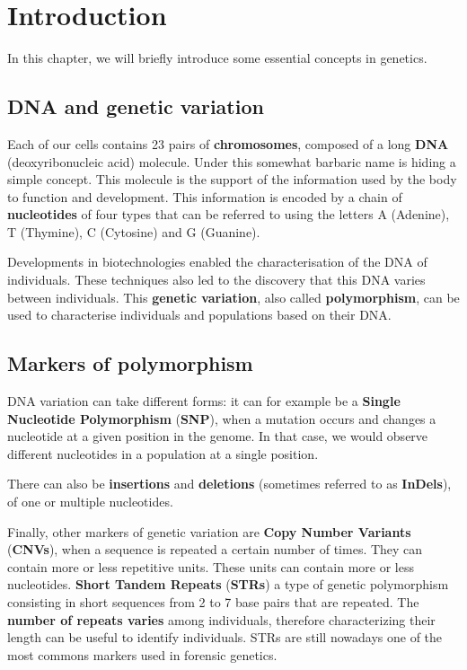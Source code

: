 \documentclass[
]{book}
\begin{document}
\hypertarget{introduction}{%
\chapter*{Introduction}\label{introduction}}

In this chapter, we will briefly introduce some essential concepts in genetics.

\hypertarget{dna-and-genetic-variation}{%
\section*{DNA and genetic variation}\label{dna-and-genetic-variation}}

Each of our cells contains 23 pairs of \textbf{chromosomes}, composed of a long \textbf{DNA}
(deoxyribonucleic acid) molecule. Under this somewhat barbaric name
is hiding a simple concept. This molecule is the support of the information
used by the body to function and development. This information is encoded by a
chain of \textbf{nucleotides} of four types that can be referred to using the letters
A (Adenine), T (Thymine), C (Cytosine) and G (Guanine).

Developments in biotechnologies enabled the characterisation of the DNA of
individuals. These techniques also led to the discovery that this DNA varies
between individuals. This \textbf{genetic variation}, also called \textbf{polymorphism},
can be used to characterise individuals and populations based on their DNA.

\hypertarget{markers-of-polymorphism}{%
\section*{Markers of polymorphism}\label{markers-of-polymorphism}}

DNA variation can take different forms: it can for example be a
\textbf{Single Nucleotide Polymorphism} (\textbf{SNP}), when a mutation occurs and changes a
nucleotide at a given position in the genome. In that case, we would observe
different nucleotides in a population at a single position.

There can also be \textbf{insertions} and \textbf{deletions} (sometimes referred to as
\textbf{InDels}), of one or multiple nucleotides.

Finally, other markers of genetic variation are \textbf{Copy Number Variants} (\textbf{CNVs}),
when a sequence is repeated a certain number of times.
They can contain more or less repetitive units. These units can contain more or
less nucleotides. \textbf{Short Tandem Repeats} (\textbf{STRs}) a type of genetic
polymorphism consisting in short sequences from 2 to 7 base pairs that are
repeated. The \textbf{number of repeats varies} among individuals, therefore characterizing
their length can be useful to identify individuals. STRs are still nowadays one of
the most commons markers used in forensic genetics.
\end{document}

